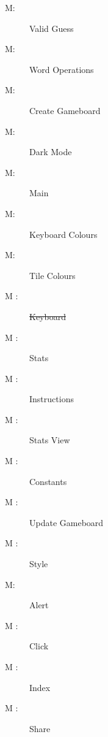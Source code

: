 \documentclass[12pt, titlepage]{article}
\newcounter{mnum}
\newcommand{\mthemnum}{M\themnum}
\begin{document}
	\begin{description}
		\item [ \mthemnum \label{m1}:]
		Valid Guess
		\item [ \mthemnum \label{m2}:]
		Word Operations
		\item [ \mthemnum \label{m3}:]
		Create Gameboard
		\item [ \mthemnum \label{m4}:]
		Dark Mode
		\item [ \mthemnum \label{m5}:]
		Main
		\item [ \mthemnum \label{m6}:]
		Keyboard Colours
		\item [ \mthemnum \label{m7}:]
		Tile Colours
		\item [ \mthemnum
		\label{m8}:]
		\st{Keyboard}
		\item [ \mthemnum
		\label{m9}:]
		Stats
		\item [ \mthemnum
		\label{m10}:]
		Instructions
		\item [ \mthemnum
		\label{m11}:]
		Stats View
		\item [ \mthemnum
		\label{m12}:]
		Constants
		\item [ \mthemnum
		\label{m13}:]
		Update Gameboard
		\item [ \mthemnum
		\label{m14}:]
		Style
		\item [ \mthemnum \label{m15}:]
		Alert
		\item [ \mthemnum
		\label{m16}:]
		Click
		\item [ \mthemnum
		\label{m17}:]
		Index
		\item [ \mthemnum
		\label{m18}:]
		Share
		
		
		
	\end{description}
	
\end{document}

